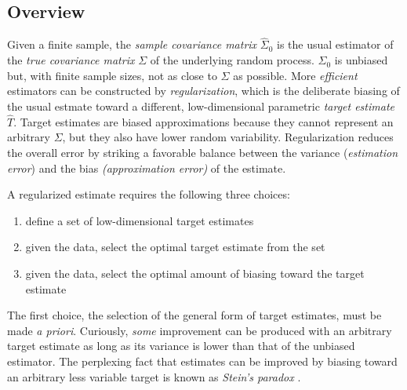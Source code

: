 \subsection{Overview}
Given a finite sample, the \emph{sample covariance matrix} $\hat\Sigma_0$ is the usual estimator of the \emph{true covariance matrix} $\Sigma$ of the underlying random process.  $\hat\Sigma_0$ is unbiased but, with finite sample sizes, not as close to $\Sigma$ as possible.  More \emph{efficient} estimators can be constructed by \emph{regularization}, which is the deliberate biasing of the usual estmate toward a different, low-dimensional parametric \emph{target estimate} $\hat T$. 
Target estimates are biased approximations because they cannot represent an arbitrary $\Sigma$, but they also have lower random variability.
Regularization reduces the overall error by striking a favorable balance between the variance  (\emph{estimation error}) and the bias \emph{(approximation error)} of the estimate.  
  
A regularized estimate requires the following three choices: 
\begin{enumerate}[  1. ]
\item define a set of low-dimensional target estimates
\item given the data, select the optimal target estimate from the set 
\item given the data, select the optimal amount of biasing toward the target estimate
\end{enumerate}
The first choice, the selection of the general form of target estimates, must be made \emph{a priori}.  Curiously, \emph{some} improvement can be produced with an arbitrary target estimate as long as its variance is lower than that of the unbiased estimator.  The perplexing fact that estimates can be improved by biasing toward an arbitrary less variable target is known as \emph{Stein's paradox} \citep{Efron:1977}.  


